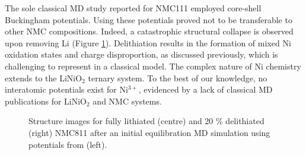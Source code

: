 \documentclass[aps,prb,twocolumn,superscriptaddress,reprint]{revtex4-1}
\begin{document}
The sole classical MD study reported for NMC111 employed core-shell Buckingham potentials. \cite{Lee_and_Park_2012}
Using these potentials proved not to be transferable to other NMC compositions. 
Indeed, a catastrophic structural collapse is observed upon removing Li (Figure \ref{fig:structure_collapse}). 
Delithiation results in the formation of mixed Ni oxidation states and charge disproportion, as discussed previously, which is challenging to represent in a classical model. \cite{Nakamura_2019,Kim_2002,Alonso_1999} 
The complex nature of Ni chemistry extends to the LiNiO$_2$ ternary system. To the best of our knowledge, no interatomic potentials exist for Ni$^{3+}$, evidenced by a lack of classical MD publications for LiNiO$_2$ and NMC systems.

\begin{figure}[tb]
  \centering
    \caption{\label{fig:structure_collapse} Structure images for fully lithiated (centre) and 20 \% delithiated (right) NMC811 after an initial equilibration MD simulation using potentials from \citeauthor{Lee_and_Park_2012} (left). \cite{Lee_and_Park_2012} }
\end{figure}
\end{document}
